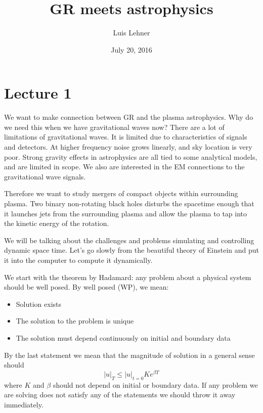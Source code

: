 \documentclass[letterpaper, 11pt]{article}
\numberwithin{equation}{section}
\numberwithin{figure}{section}
\begin{document}
\title{GR meets astrophysics}
\author{Luis Lehner}
\date{July 20, 2016}

\maketitle

\section{Lecture 1}

We want to make connection between GR and the plasma astrophysics. Why do we
need this when we have gravitational waves now? There are a lot of limitations
of gravitational waves. It is limited due to characteristics of signals and
detectors. At higher frequency noise grows linearly, and sky location is very
poor. Strong gravity effects in astrophysics are all tied to some
analytical models, and are limited in scope. We also are interested in the EM
connections to the gravitational wave signals.

Therefore we want to study mergers of compact objects within surrounding plasma.
Two binary non-rotating black holes disturbs the spacetime enough that it
launches jets from the surrounding plasma and allow the plasma to tap into the
kinetic energy of the rotation.

We will be talking about the challenges and problems simulating and controlling
dynamic space time. Let's go slowly from the beautiful theory of Einstein and
put it into the computer to compute it dynamically.

We start with the theorem by Hadamard: any problem about a physical system
should be well posed. By well posed (WP), we mean:
\begin{itemize}
\item Solution exists
    \item The solution to the problem is unique
    \item The solution must depend continuously on initial and boundary data
\end{itemize}
By the last statement we mean that the magnitude of solution in a general sense
should
\begin{equation}
  \label{eq:1}
  \left| u \right|_T \leq \left| u \right|_{t = 0} K e^{\beta T}
\end{equation}
where $K$ and $\beta$ should not depend on initial or boundary data. If any
problem we are solving does not satisfy any of the statements we should throw it
away immediately.
\end{document}
